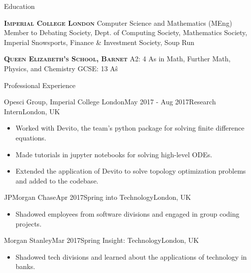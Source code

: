 \documentclass[10pt,a4paper]{xun-cv}
\begin{document}
\begin{section}{Education}

\textsc{\textbf{Imperial College London}}
Computer Science and Mathematics (MEng)
Member to Debating Society, Dept. of Computing Society, Mathematics Society, 
Imperial Snowsports, Finance \& Investment Society, Soup Run

\textsc{\textbf{Queen Elizabeth's School, Barnet}}
A2: 4 A\*s in Math, Further Math, Physics, and Chemistry
GCSE: 13 A\^s


\begin{section}{Professional Experience}

    \begin{rSubsection}{Opesci Group, Imperial College London}{May 2017 - Aug 2017}{Research Intern}{London, UK}
\begin{itemize}
    \item Worked with Devito, the team's python package for solving finite difference equations.
    \item Made tutorials in jupyter notebooks for solving high-level ODEs.
    \item Extended the application of Devito to solve topology optimization problems and added to the codebase.
\end{itemize}


\begin{rSubsection}{JPMorgan Chase}{Apr 2017}{Spring into Technology}{London, UK}
\begin{itemize}
    \item Shadowed employees from software divisions and engaged in group coding projects.
\end{itemize}


\begin{rSubsection}{Morgan Stanley}{Mar 2017}{Spring Insight: Technology}{London, UK}
\begin{itemize}
    \item Shadowed tech divisions and learned about the applications of technology in banks.
\end{itemize}


\end{rSubsection}
\end{rSubsection}
\end{rSubsection}
\end{section}
\end{section}
\end{document}

